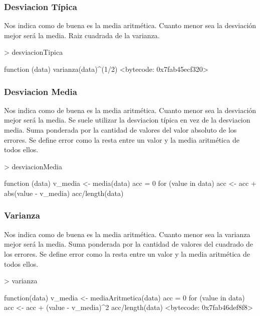 \documentclass [a4paper] {article}
\begin{document}
\subsubsection{Desviacion Típica}
Nos indica como de buena es la media aritmética. Cuanto menor sea la desviación mejor será la media.
Raiz cuadrada de la varianza.
\begin{Schunk}
\begin{Sinput}
> desviacionTipica
\end{Sinput}
\begin{Soutput}
function (data) {
  varianza(data)^(1/2)
}
<bytecode: 0x7fab45ecf320>
\end{Soutput}
\end{Schunk}
\subsubsection{Desviacion Media}
Nos indica como de buena es la media aritmética. Cuanto menor sea la desviación mejor será la media.
Se suele utilizar la desviacion típica en vez de la desviacion media.
Suma ponderada por la cantidad de valores del valor absoluto de los errores.
Se define error como la resta entre un valor y la media aritmética de todos ellos.
\begin{Schunk}
\begin{Sinput}
> desviacionMedia
\end{Sinput}
\begin{Soutput}
function (data){
  v_media <- media(data)
  acc = 0
  for (value in data){
    acc <- acc + abs(value - v_media)
  }
  acc/length(data)
}
\end{Soutput}
\end{Schunk}
\subsubsection{Varianza}
Nos indica como de buena es la media aritmética. Cuanto menor sea la varianza mejor será la media.
Suma ponderada por la cantidad de valores del cuadrado de los errores.
Se define error como la resta entre un valor y la media aritmética de todos ellos.
\begin{Schunk}
\begin{Sinput}
> varianza
\end{Sinput}
\begin{Soutput}
function(data){
  v_media <- mediaAritmetica(data)
  acc = 0
  for (value in data){
    acc <- acc + (value - v_media)^2
  }
  acc/length(data)
}
<bytecode: 0x7fab46def8f8>
\end{Soutput}
\end{Schunk}
\end{document}
